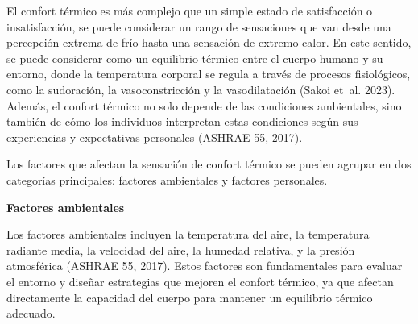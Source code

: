 \documentclass[
  12pt,
  letterpaper,
  DIV=11,
  numbers=noendperiod]{scrreport}
\begin{document}
El confort térmico es más complejo que un simple estado de satisfacción
o insatisfacción, se puede considerar un rango de sensaciones que van
desde una percepción extrema de frío hasta una sensación de extremo
calor. En este sentido, se puede considerar como un equilibrio térmico
entre el cuerpo humano y su entorno, donde la temperatura corporal se
regula a través de procesos fisiológicos, como la sudoración, la
vasoconstricción y la vasodilatación (Sakoi et~al. 2023). Además, el
confort térmico no solo depende de las condiciones ambientales, sino
también de cómo los individuos interpretan estas condiciones según sus
experiencias y expectativas personales (ASHRAE 55, 2017).

Los factores que afectan la sensación de confort térmico se pueden
agrupar en dos categorías principales: factores ambientales y factores
personales.

\textbf{Factores ambientales}

Los factores ambientales incluyen la temperatura del aire, la
temperatura radiante media, la velocidad del aire, la humedad relativa,
y la presión atmosférica (ASHRAE 55, 2017). Estos factores son
fundamentales para evaluar el entorno y diseñar estrategias que mejoren
el confort térmico, ya que afectan directamente la capacidad del cuerpo
para mantener un equilibrio térmico adecuado.
\end{document}

